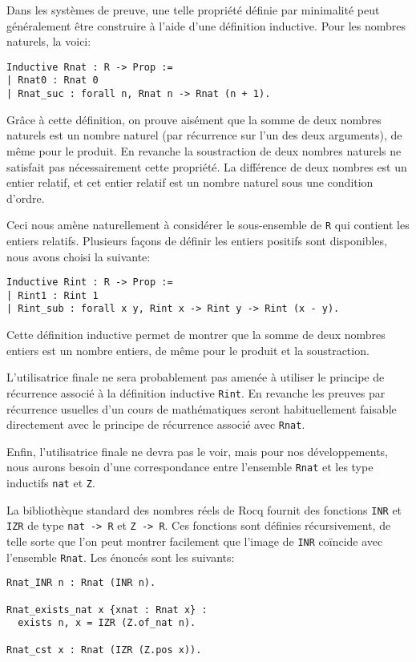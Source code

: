 \documentclass{jflart}
\begin{document}
Dans les systèmes de preuve, une telle propriété définie par minimalité
peut généralement être construire à l'aide d'une définition inductive.
Pour les nombres naturels, la voici:
\begin{verbatim}
Inductive Rnat : R -> Prop :=
| Rnat0 : Rnat 0
| Rnat_suc : forall n, Rnat n -> Rnat (n + 1).
\end{verbatim}

Grâce à cette définition, on prouve aisément que la somme de deux
nombres naturels est un nombre naturel (par récurrence sur l'un des
deux arguments), de même pour le produit.  En revanche la soustraction
de deux nombres naturels ne satisfait pas nécessairement cette
propriété.  La différence de deux nombres est un entier relatif, et
cet entier relatif est un nombre naturel sous une condition d'ordre.

Ceci nous amène naturellement à considérer le sous-ensemble de \texttt{R}
qui contient les entiers relatifs.  Plusieurs façons de définir les
entiers positifs sont disponibles, nous avons choisi la suivante:
\begin{verbatim}
Inductive Rint : R -> Prop :=
| Rint1 : Rint 1
| Rint_sub : forall x y, Rint x -> Rint y -> Rint (x - y).
\end{verbatim}
Cette définition inductive permet de montrer que la somme de deux
nombres entiers est un nombre entiers, de même pour le produit et
la soustraction.

L'utilisatrice finale ne sera probablement pas amenée à utiliser le
principe de récurrence associé à la définition inductive \texttt{Rint}.
En revanche les preuves par récurrence usuelles d'un cours de
mathématiques seront habituellement faisable directement avec le
principe de récurrence associé avec \texttt{Rnat}.

Enfin, l'utilisatrice finale ne devra pas le voir,
mais pour nos développements, nous aurons besoin d'une
correspondance entre l'ensemble \texttt{Rnat} et les type inductifs
\texttt{nat} et \texttt{Z}.

La bibliothèque standard des nombres réels de Rocq fournit des fonctions
\texttt{INR} et \texttt{IZR} de type \texttt{nat -> R} et \texttt{Z -> R}.
Ces fonctions sont définies récursivement, de telle sorte que l'on peut
montrer facilement
que l'image de \texttt{INR} coïncide avec l'ensemble \texttt{Rnat}.  Les
énoncés sont les suivants:
\begin{verbatim}
Rnat_INR n : Rnat (INR n).

Rnat_exists_nat x {xnat : Rnat x} :
  exists n, x = IZR (Z.of_nat n).

Rnat_cst x : Rnat (IZR (Z.pos x)). 
\end{verbatim}
\end{document}
